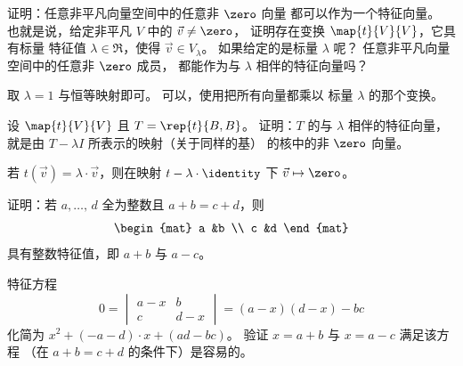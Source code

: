   \recommended \item 
    \begin{exparts}
      \partsitem 证明：任意非平凡向量空间中的任意非 \( \zero \) 向量
        都可以作为一个特征向量。
        也就是说，给定非平凡 \( V \) 中的 \( \vec{v}\neq\zero \)，
        证明存在变换 \( \map{t}{V}{V} \)，它具有标量
        特征值 \( \lambda\in\Re \)，使得 \( \vec{v}\in V_{\lambda} \)。
      \partsitem 如果给定的是标量 \( \lambda \) 呢？
        任意非平凡向量空间中的任意非 \( \zero \) 成员，
        都能作为与 \( \lambda \) 相伴的特征向量吗？
    \end{exparts}
    \begin{answer}
      \begin{exparts}
        \partsitem 取 \( \lambda=1 \) 与恒等映射即可。
        \partsitem 可以，使用把所有向量都乘以
          标量 \( \lambda \) 的那个变换。
      \end{exparts}  
     \end{answer}
  \recommended \item 
    设 \( \map{t}{V}{V} \) 且 \( T=\rep{t}{B,B} \)。
    证明：\( T \) 的与 \( \lambda \) 相伴的特征向量，
    就是由 \( T-\lambda I \) 所表示的映射（关于同样的基）
    的核中的非 \( \zero \) 向量。
    \begin{answer}
      若 $t(\vec{v})=\lambda\cdot\vec{v}$，则在映射 $t-\lambda\cdot\identity$
      下 $\vec{v}\mapsto\zero$。
    \end{answer}
  \item 
    证明：若 $a,\ldots,\,d$ 全为整数且 \( a+b=c+d \)，则
    \begin{equation*}
      \begin{mat}
         a  &b  \\
         c  &d
      \end{mat}
    \end{equation*}
    具有整数特征值，即 \( a+b \) 与 \( a-c \)。
    \begin{answer}
      特征方程
      \begin{equation*}
        0=
        \begin{vmatrix}
          a-x  &b  \\
          c    &d-x 
        \end{vmatrix}
        =(a-x)(d-x)-bc
      \end{equation*}
      化简为 $x^2+(-a-d)\cdot x + (ad-bc)$。
      验证 $x=a+b$ 与 $x=a-c$ 满足该方程
      （在 $a+b=c+d$ 的条件下）是容易的。
    \end{answer}
  \recommended \item
